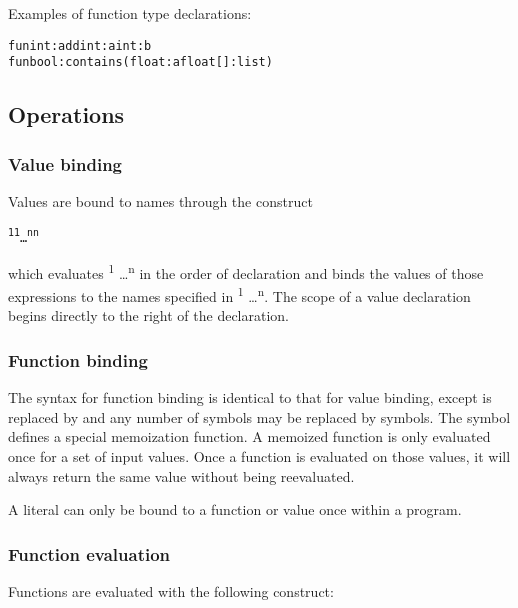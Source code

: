 Examples of function type declarations: 

\begin{alltt}
\quad fun int:add int:a int:b
\quad fun bool:contains (float:a float[]:list)
\end{alltt}

\subsection{Operations}

\subsubsection{Value binding}

Values are bound to names through the construct 

\begin{alltt}
\quad {}\textsuperscript{1} \term{=} \textsuperscript{1}   \dots {} \textsuperscript{n} \term{=} \textsuperscript{n}  
\end{alltt}

which evaluates  \textsuperscript{1} \dots  {}\textsuperscript{n} in the order of declaration and binds the values of those expressions to the names specified in \textsuperscript{1} \dots {}\textsuperscript{n}. The scope of a value declaration begins directly to the right of the declaration.

\subsubsection{Function binding}

The syntax for function binding is identical to that for value binding, except  is replaced by  and any number of \term{=} symbols may be replaced by \term{:=} symbols. The \term{:=} symbol defines a special memoization function. A memoized function is only evaluated once for a set of input values. Once a function is evaluated on those values, it will always return the same value without being reevaluated. 

A literal can only be bound to a function or value once within a program.

\subsubsection{Function evaluation}
Functions are evaluated with the following construct:

